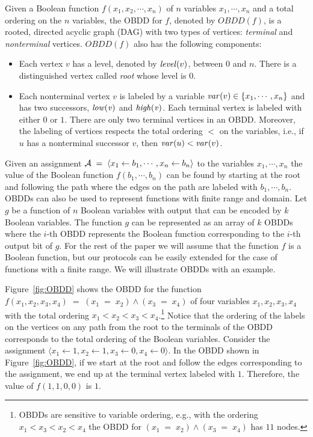 Given a Boolean function $f(x_1,x_2,\cdots,x_n)$ of $n$ variables
$x_1, \cdots, x_n$ and a total ordering on the $n$ variables, the OBDD
for $f$, denoted by $OBDD(f)$, is a rooted, directed acyclic graph
(DAG) with two types of vertices: {\it terminal} and {\it nonterminal}
vertices. $OBDD(f)$ also has the following components:
\begin{itemize}
\item Each vertex
$v$ has a level, denoted by ${\it level}(v)$, between $0$ and $n$. There is a 
distinguished vertex called  {\it root} whose level is $0$. 

\item Each nonterminal vertex $v$ is labeled by a variable ${\it var}(v) \in \{ x_1,\cdots,x_n \}$ and 
has two successors, ${\it low (v)}$ and ${\it high (v)}$. Each
terminal vertex is labeled with either $0$ or $1$. There are only two terminal vertices 
in an OBDD. Moreover, the labeling of vertices respects the total ordering $<$ on the
variables, i.e., if $u$ has a nonterminal successor $v$, then ${\it var}(u) < {\it var}(v)$. 
\end{itemize}
Given an assignment ${\cal A} \; = \; \langle x_1 \leftarrow b_1,
\cdots, x_n \leftarrow b_n \rangle$ to the variables $x_1,\cdots,x_n$
the value of the Boolean function $f(b_1,\cdots,b_n)$ can be found by
starting at the root and following the path where the edges on the
path are labeled with $b_1, \cdots, b_n$. OBDDs can also be used to
represent functions with finite range and domain. Let $g$ be a
function of $n$ Boolean variables with output that can be encoded by
$k$ Boolean variables. The function $g$ can be represented as an array
of $k$ OBDDs where the $i$-th OBDD represents the Boolean function
corresponding to the $i$-th output bit of $g$.  For the rest of the
paper we will assume that the function $f$ is a Boolean function, but
our protocols can be easily extended for the case of functions with a
finite range. We will illustrate OBDDs with an example.
\begin{example}
\label{example:bdd}
\rm
Figure~\ref{fig:OBDD} shows the OBDD for the  function
$f(x_1,x_2,x_3, x_4) \; = \; (x_1 \; = \; x_2) \wedge (x_3 \; = \;
x_4)$ of four variables $x_1,x_2,x_3,x_4$ with the total ordering $x_1
< x_2 < x_3 < x_4$.\footnote{OBDDs are sensitive to variable
ordering, e.g., with the ordering $x_1 < x_3 < x_2 < x_4$ the OBDD for
$(x_1 \; = \; x_2) \wedge (x_3 \; = \; x_4)$ has $11$ nodes.}  Notice that the ordering of
the labels on the vertices on any path from the root to the terminals
of the OBDD corresponds to the total ordering of the Boolean
variables. Consider the assignment $\langle x_1 \leftarrow 1, x_2
\leftarrow 1, x_3 \leftarrow 0, x_4 \leftarrow 0 \rangle$.  In the
OBDD shown in Figure~\ref{fig:OBDD}, if we start at the root and
follow the edges corresponding to the assignment, we end up at the
terminal vertex labeled with $1$. Therefore, the value of $f(1,1,0,0)$
is $1$.
\end{example}

